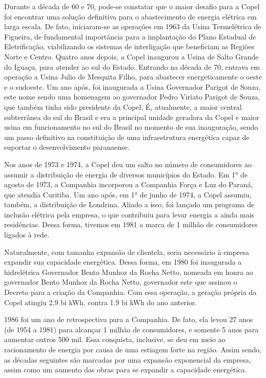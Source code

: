 \documentclass[grad,numbers]{coppe}
\begin{document}
  Durante a década de 60 e 70, pode-se constatar que o maior desafio para a Copel foi encontrar uma solução definitiva para o abastecimento de energia elétrica em larga escala. De fato, iniciaram-se as operações em 1963 da Usina Termelétrica de Figueira, de fundamental importância para a implantação do Plano Estadual de Eletrificação, viabilizando os sistemas de interligação que beneficiam as Regiões Norte e Centro. Quatro anos depois, a Copel inaugurou a Usina de Salto Grande do Iguaçu, para atender ao sul do Estado. Entrando na década de 70, entrava em operação a Usina Julio de Mesquita Filho, para abastecer energeticamente o oeste e o sudoeste. Um ano após, foi inaugurada a Usina Governador Parigot de Souza, este nome sendo uma homenagem ao governador Pedro Viriato Parigot de Souza, que também tinha sido presidente da Copel. É, atualmente, a maior central subterrânea do sul do Brasil e era a principal unidade geradora da Copel e maior usina em funcionamento no sul do Brasil no momento de sua inauguração, sendo um passo definitivo na constituição de uma infraestrutura energética capaz de suportar o desenvolvimento paranaense.

  Nos anos de 1973 e 1974, a Copel deu um salto no número de consumidores ao assumir a distribuição de energia de diversos municípios do Estado. Em 1° de agosto de 1973, a Companhia incorporou a Companhia Força e Luz do Paraná, que atendia Curitiba. Um ano após, em 1° de junho de 1974, a Copel assumiu, também, a distribuição de Londrina. Aliado a isso, foi lançado um programa de inclusão elétrica pela empresa, o que contribuiu para levar energia a ainda mais residências. Dessa forma, tivemos em 1981 a marca de 1 milhão de consumidores ligados à rede.

  Naturalmente, com tamanha expansão de clientela, seria necessário à empresa expandir sua capacidade energética. Dessa forma, em 1980 foi inaugurada a hidrelétrica Governador Bento Munhoz da Rocha Netto, nomeada em honra ao governador Bento Munhoz da Rocha Netto, governador este que assinou o Decreto para a criação da Companhia. Com essa operação, a geração própria da Copel atingiu 2.9 bi kWh, contra 1.9 bi kWh do ano anterior.

  1986 foi um ano de retrospectiva para a Companhia. De fato, ela levou 27 anos (de 1954 a 1981) para alcançar 1 milhão de consumidores, e somente 5 anos para aumentar outros 500 mil. Essa conquista, inclusive, se deu em meio ao racionamento de energia por causa de uma estiagem forte na região. Assim sendo, as décadas seguintes são marcadas por uma expansão exponencial da empresa, assim como um aumento das obras para se expandir a capacidade energética.
\end{document}
